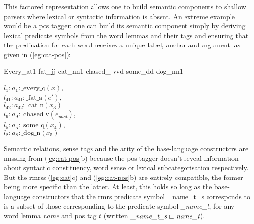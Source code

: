 This factored representation allows one to build semantic components
to shallow parsers where lexical or syntactic information is absent.
An extreme example would be a {\sc 
  pos} tagger: one can build its semantic component simply by deriving
lexical predicate symbols from the word lemmas and their tags and ensuring
that the predication for each word receives a unique label, anchor and
argument, as given in (\ref{eg:cat-pos}):
\begin{examples}
\item   \label{eg:cat-pos}
\begin{subexamples}
\item   Every\_{\sc at1} fat\_{\sc jj} cat\_{\sc nn1} chased\_{\sc
    vvd} some\_{\sc dd} dog\_{\sc nn1}
\item   $l_1:a_1:\mbox{\_every\_q}(x)$, \\
$l_{41}:a_{41}:\mbox{\_fat\_a}(e')$,\\
$l_{42}:a_{42}:\mbox{\_cat\_n}(x_3)$\\
$l_9:a_9:\mbox{\_chased\_v}(e_{past})$, \\
$l_5:a_5:\mbox{\_some\_q}(x_4)$, \\
$l_8:a_8:\mbox{\_dog\_n}(x_5)$
\end{subexamples}
\end{examples}
Semantic relations, sense tags and the arity of the base-language
constructors are
missing from (\ref{eg:cat-pos}b) because the {\sc pos} tagger doesn't
reveal information about syntactic constituency, word sense or lexical
subcategorisation respectively.  
But the {\sc rmrs}s (\ref{eg:cat}c) and
(\ref{eg:cat-pos}b) are entirely compatible, the former being more
specific than the latter.  At least, this holds so long as the
base-language constructors that the {\sc rmrs} predicate symbol
{\_name\_t\_s} corresponds to is a 
subset of those corresponding to the predicate symbol {\em \_name\_t},
for any word lemma {\em name} and {\sc pos} tag $t$ (written 
$\mbox{{\em \_name\_t\_s}} \sqsubset \mbox{{\em name\_t}}$). 

